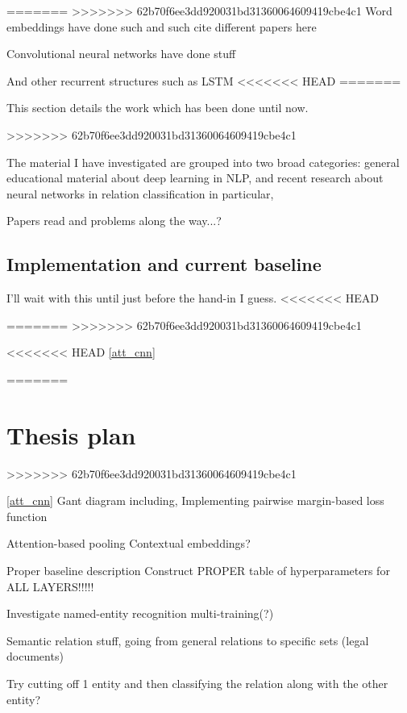 \documentclass{article}
\begin{document}
=======
>>>>>>> 62b70f6ee3dd920031bd31360064609419cbe4c1
Word embeddings have done such and such
cite different papers here

Convolutional neural networks have done stuff

And other recurrent structures such as LSTM
<<<<<<< HEAD
=======


This section details the work which has been done until now. 

>>>>>>> 62b70f6ee3dd920031bd31360064609419cbe4c1



The material I have investigated are grouped into two broad categories: general educational material about deep learning in NLP, and recent research about neural networks in relation classification in particular,  


Papers read and problems along the way...?


\subsection{Implementation and current baseline}

I'll wait with this until just before the hand-in I guess.
<<<<<<< HEAD

=======
>>>>>>> 62b70f6ee3dd920031bd31360064609419cbe4c1


<<<<<<< HEAD
\ref{att_cnn}
\cite{att_cnn}

\begin{center}
\end{center}

=======
\section{Thesis plan}
>>>>>>> 62b70f6ee3dd920031bd31360064609419cbe4c1

\ref{att_cnn}
\cite{att_cnn}
Gant diagram including,
Implementing pairwise margin-based loss function

Attention-based pooling
Contextual embeddings?

Proper baseline description
Construct PROPER table of hyperparameters for ALL LAYERS!!!!!

Investigate named-entity recognition multi-training(?)

Semantic relation stuff, going from general relations to specific
sets (legal documents)

Try cutting off 1 entity and then classifying the relation along with the other entity?






    
\end{document}
